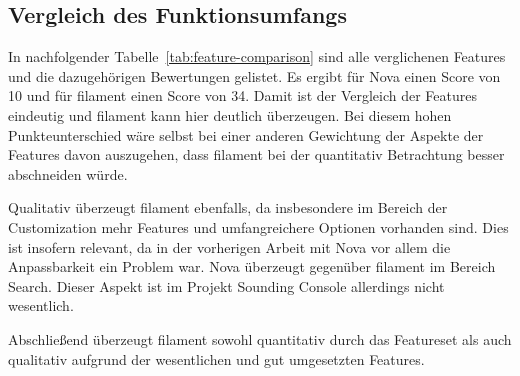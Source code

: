 \subsection{Vergleich des Funktionsumfangs}
In nachfolgender Tabelle~\ref{tab:feature-comparison} sind alle verglichenen Features und die dazugehörigen Bewertungen gelistet.
Es ergibt für Nova einen Score von 10 und für filament einen Score von 34.
Damit ist der Vergleich der Features eindeutig und filament kann hier deutlich überzeugen.
Bei diesem hohen Punkteunterschied wäre selbst bei einer anderen Gewichtung der Aspekte der Features davon auszugehen, dass filament bei der quantitativ Betrachtung besser abschneiden würde.

Qualitativ überzeugt filament ebenfalls, da insbesondere im Bereich der Customization mehr Features und umfangreichere Optionen vorhanden sind.
Dies ist insofern relevant, da in der vorherigen Arbeit mit Nova vor allem die Anpassbarkeit ein Problem war.
Nova überzeugt gegenüber filament im Bereich Search.
Dieser Aspekt ist im Projekt Sounding Console allerdings nicht wesentlich.

Abschließend überzeugt filament sowohl quantitativ durch das Featureset als auch qualitativ aufgrund der wesentlichen und gut umgesetzten Features.


